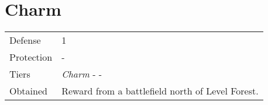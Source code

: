 \section{Charm}
\label{armor:charm}


\noindent\begin{tabularx}{\textwidth}[l]{lX}
	Defense
	& 1
\\ %
	Protection
	& -
\\ %
	Tiers
	& \textit{Charm} - \nameref{armor:magic_ring} - \nameref{armor:cupid_locket}
\\ %
	Obtained
	& Reward from a battlefield north of Level Forest.
\end{tabularx}
